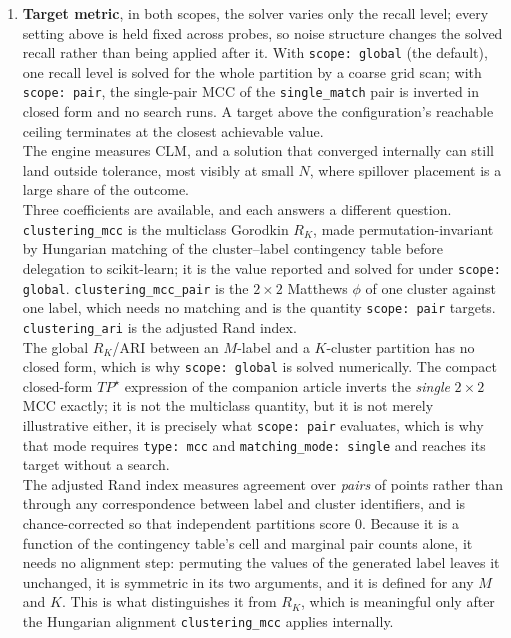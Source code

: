 \documentclass[a4paper,12pt]{article}
\begin{document}
\begin{enumerate}
    \item \textbf{Target metric}, in both scopes, the solver varies only the recall level; every setting above is held fixed across probes, so noise structure changes the solved recall rather than being applied after it. With \texttt{scope: global} (the default), one recall level is solved for the whole partition by a coarse grid scan; with \texttt{scope: pair}, the single-pair MCC of the \texttt{single\_match} pair is inverted in closed form and no search runs. A target above the configuration's reachable ceiling terminates at the closest achievable value.\\
    The engine measures CLM, and a solution that converged internally can still land outside tolerance, most visibly at small $N$, where spillover placement is a large share of the outcome.\\
    Three coefficients are available, and each answers a different question. \texttt{clustering\_mcc} is the multiclass Gorodkin $R_K$, made permutation-invariant by Hungarian matching of the cluster--label contingency table before delegation to scikit-learn; it is the value reported and solved for under \texttt{scope: global}. \texttt{clustering\_mcc\_pair} is the $2\times2$ Matthews $\phi$ of one cluster against one label, which needs no matching and is the quantity \texttt{scope: pair} targets. \texttt{clustering\_ari} is the adjusted Rand index.\\
    \noindent The global $R_K$/ARI between an $M$-label and a $K$-cluster partition has no closed form, which is why \texttt{scope: global} is solved numerically. The compact closed-form $TP^\star$ expression of the companion article inverts the \emph{single} $2\times2$ MCC exactly; it is not the multiclass quantity, but it is not merely illustrative either, it is precisely what \texttt{scope: pair} evaluates, which is why that mode requires \texttt{type: mcc} and \texttt{matching\_mode: single} and reaches its target without a search.\\
    \noindent The adjusted Rand index measures agreement over \emph{pairs} of points rather than through any correspondence between label and cluster identifiers, and is chance-corrected so that independent partitions score $0$. Because it is a function of the contingency table's cell and marginal pair counts alone, it needs no alignment step: permuting the values of the generated label leaves it unchanged, it is symmetric in its two arguments, and it is defined for any $M$ and $K$. This is what distinguishes it from $R_K$, which is meaningful only after the Hungarian alignment \texttt{clustering\_mcc} applies internally. 
    

\end{enumerate}
\end{document}
